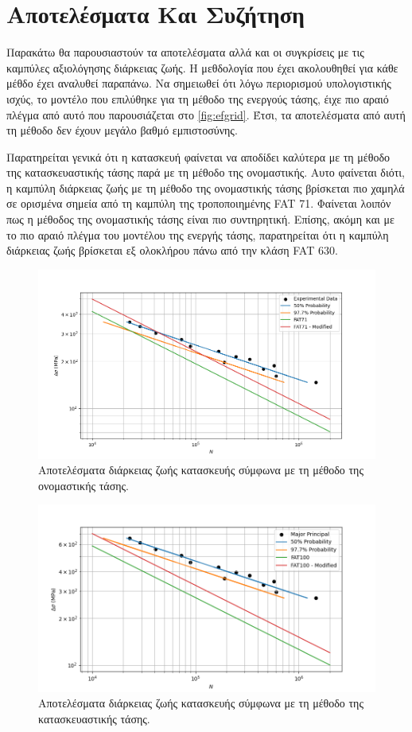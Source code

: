 \documentclass{article}
\begin{document}
\section{Αποτελέσματα Και Συζήτηση}
Παρακάτω θα παρουσιαστούν τα αποτελέσματα αλλά και οι συγκρίσεις με τις καμπύλες αξιολόγησης διάρκειας ζωής. Η μεθδολογία που έχει ακολουθηθεί για κάθε μέθδο έχει αναλυθεί παραπάνω. Να σημειωθεί ότι λόγω περιορισμού υπολογιστικής ισχύς, το μοντέλο που επιλύθηκε για τη μέθοδο της ενεργούς τάσης, έιχε πιο αραιό πλέγμα από αυτό που παρουσιάζεται στο \ref{fig:efgrid}. Έτσι, τα αποτελέσματα από αυτή τη μέθοδο δεν έχουν μεγάλο βαθμό εμπιστοσύνης.
\par Παρατηρείται γενικά ότι η κατασκευή φαίνεται να αποδίδει καλύτερα με τη μέθοδο της κατασκευαστικής τάσης παρά με τη μέθοδο της ονομαστικής. Αυτο φαίνεται διότι, η καμπύλη διάρκειας ζωής με τη μέθοδο της ονομαστικής τάσης βρίσκεται πιο χαμηλά σε ορισμένα σημεία από τη καμπύλη της τροποποιημένης FAT 71. Φαίνεται λοιπόν πως η μέθοδος της ονομαστικής τάσης είναι πιο συντηρητική. Επίσης, ακόμη και με το πιο αραιό πλέγμα του μοντέλου της ενεργής τάσης, παρατηρείται ότι η καμπύλη διάρκειας ζωής βρίσκεται εξ ολοκλήρου πάνω από την κλάση FAT 630.

\begin{figure}[H]
    \centering
    \includegraphics[width = 0.8\linewidth]{media/nominal.png}
    \caption{Αποτελέσματα διάρκειας ζωής κατασκευής σύμφωνα με τη μέθοδο της ονομαστικής τάσης.}
    \label{fig:nomr}
\end{figure}
\begin{figure}[H]
    \centering
    \includegraphics[width = 0.8\linewidth]{media/shs.png}
    \caption{Αποτελέσματα διάρκειας ζωής κατασκευής σύμφωνα με τη μέθοδο της κατασκευαστικής τάσης.}
    \label{fig:shsr}
\end{figure}
\end{document}
